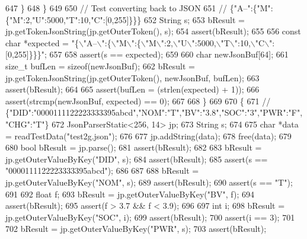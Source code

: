 \begin{DoxyCode}
{{{{{{647                 \}
648             \}
649 
650             \textcolor{comment}{// Test converting back to JSON}
651             \textcolor{comment}{// \{"A--":\{"M":\{"M":2,"U":5000,"T":10,"C":[0,255]\}\}\}}
652             String s;
653             bResult = jp.getTokenJsonString(jp.getOuterToken(), s);
654             assert(bResult);
655 
656             \textcolor{keyword}{const} \textcolor{keywordtype}{char} *expected = \textcolor{stringliteral}{"\{\(\backslash\)"A--\(\backslash\)":\{\(\backslash\)"M\(\backslash\)":\{\(\backslash\)"M\(\backslash\)":2,\(\backslash\)"U\(\backslash\)":5000,\(\backslash\)"T\(\backslash\)":10,\(\backslash\)"C\(\backslash\)":[0,255]\}\}\}"};
657 
658             assert(s == expected);
659 
660             \textcolor{keywordtype}{char} newJsonBuf[64];
661             \textcolor{keywordtype}{size\_t} bufLen = \textcolor{keyword}{sizeof}(newJsonBuf);
662             bResult = jp.getTokenJsonString(jp.getOuterToken(), newJsonBuf, bufLen);
663             assert(bResult);
664 
665             assert(bufLen = (strlen(expected) + 1));
666             assert(strcmp(newJsonBuf, expected) == 0);
667 
668         \}
669 
670         \{
671             \textcolor{comment}{// \{"DID":"0000111122223333395abcd","NOM":"T","BV":"3.8","SOC":"3","PWR":"F","CHG":"T"\}}
672             JsonParserStatic<256, 14> jp;
673             String s;
674 
675             \textcolor{keywordtype}{char} *data = readTestData(\textcolor{stringliteral}{"test2g.json"});
676 
677             jp.addString(data);
678             free(data);
679 
680             \textcolor{keywordtype}{bool} bResult = jp.parse();
681             assert(bResult);
682 
683             bResult = jp.getOuterValueByKey(\textcolor{stringliteral}{"DID"}, s);
684             assert(bResult);
685             assert(s == \textcolor{stringliteral}{"0000111122223333395abcd"});
686 
687 
688             bResult = jp.getOuterValueByKey(\textcolor{stringliteral}{"NOM"}, s);
689             assert(bResult);
690             assert(s == \textcolor{stringliteral}{"T"});
691 
692             \textcolor{keywordtype}{float} f;
693             bResult = jp.getOuterValueByKey(\textcolor{stringliteral}{"BV"}, f);
694             assert(bResult);
695             assert(f > 3.7 && f < 3.9);
696 
697             \textcolor{keywordtype}{int} i;
698             bResult = jp.getOuterValueByKey(\textcolor{stringliteral}{"SOC"}, i);
699             assert(bResult);
700             assert(i == 3);
701 
702             bResult = jp.getOuterValueByKey(\textcolor{stringliteral}{"PWR"}, s);
703             assert(bResult);
}}}}}}
\end{DoxyCode}
